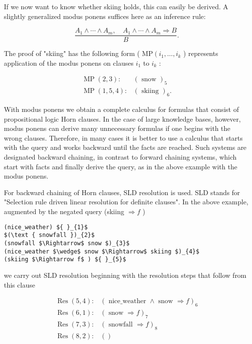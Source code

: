 \documentclass[10pt]{article}
\begin{document}
If we now want to know whether skiing holds, this can easily be derived. A slightly generalized modus ponens suffices here as an inference rule:

$$
\frac{A_{1} \wedge \cdots \wedge A_{m}, \quad A_{1} \wedge \cdots \wedge A_{m} \Rightarrow B}{B} .
$$

The proof of "skiing" has the following form ( $\mathrm{MP}\left(i_{1}, \ldots, i_{k}\right.$ ) represents application of the modus ponens on clauses $i_{1}$ to $i_{k}$ :

$$
\begin{array}{ll}
\operatorname{MP}(2,3): & (\text { snow })_{5} \\
\operatorname{MP}(1,5,4): & (\text { skiing })_{6} .
\end{array}
$$

With modus ponens we obtain a complete calculus for formulas that consist of propositional logic Horn clauses. In the case of large knowledge bases, however, modus ponens can derive many unnecessary formulas if one begins with the wrong clauses. Therefore, in many cases it is better to use a calculus that starts with the query and works backward until the facts are reached. Such systems are designated backward chaining, in contrast to forward chaining systems, which start with facts and finally derive the query, as in the above example with the modus ponens.

For backward chaining of Horn clauses, SLD resolution is used. SLD stands for "Selection rule driven linear resolution for definite clauses". In the above example, augmented by the negated query (skiing $\Rightarrow f$ )

\begin{verbatim}
(nice_weather) ${ }_{1}$
$(\text { snowfall })_{2}$
(snowfall $\Rightarrow$ snow $)_{3}$
(nice_weather $\wedge$ snow $\Rightarrow$ skiing $)_{4}$
(skiing $\Rightarrow f$ ) ${ }_{5}$
\end{verbatim}

we carry out SLD resolution beginning with the resolution steps that follow from this clause

$$
\begin{array}{ll}
\operatorname{Res}(5,4): & (\text { nice_weather } \wedge \text { snow } \Rightarrow f)_{6} \\
\operatorname{Res}(6,1): & (\text { snow } \Rightarrow f)_{7} \\
\operatorname{Res}(7,3): & (\text { snowfall } \Rightarrow f)_{8} \\
\operatorname{Res}(8,2): & ()
\end{array}
$$
\end{document}
